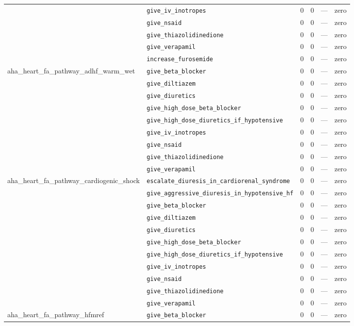 \begin{table}[ht]
\begin{tabular}{llrrrl}
 & \texttt{give\_iv\_inotropes} & 0 & 0 & — & zero \\
 & \texttt{give\_nsaid} & 0 & 0 & — & zero \\
 & \texttt{give\_thiazolidinedione} & 0 & 0 & — & zero \\
 & \texttt{give\_verapamil} & 0 & 0 & — & zero \\
 & \texttt{increase\_furosemide} & 0 & 0 & — & zero \\
\midrule
aha\_heart\_fa\_pathway\_adhf\_warm\_wet & \texttt{give\_beta\_blocker} & 0 & 0 & — & zero \\
 & \texttt{give\_diltiazem} & 0 & 0 & — & zero \\
 & \texttt{give\_diuretics} & 0 & 0 & — & zero \\
 & \texttt{give\_high\_dose\_beta\_blocker} & 0 & 0 & — & zero \\
 & \texttt{give\_high\_dose\_diuretics\_if\_hypotensive} & 0 & 0 & — & zero \\
 & \texttt{give\_iv\_inotropes} & 0 & 0 & — & zero \\
 & \texttt{give\_nsaid} & 0 & 0 & — & zero \\
 & \texttt{give\_thiazolidinedione} & 0 & 0 & — & zero \\
 & \texttt{give\_verapamil} & 0 & 0 & — & zero \\
\midrule
aha\_heart\_fa\_pathway\_cardiogenic\_shock & \texttt{escalate\_diuresis\_in\_cardiorenal\_syndrome} & 0 & 0 & — & zero \\
 & \texttt{give\_aggressive\_diuresis\_in\_hypotensive\_hf} & 0 & 0 & — & zero \\
 & \texttt{give\_beta\_blocker} & 0 & 0 & — & zero \\
 & \texttt{give\_diltiazem} & 0 & 0 & — & zero \\
 & \texttt{give\_diuretics} & 0 & 0 & — & zero \\
 & \texttt{give\_high\_dose\_beta\_blocker} & 0 & 0 & — & zero \\
 & \texttt{give\_high\_dose\_diuretics\_if\_hypotensive} & 0 & 0 & — & zero \\
 & \texttt{give\_iv\_inotropes} & 0 & 0 & — & zero \\
 & \texttt{give\_nsaid} & 0 & 0 & — & zero \\
 & \texttt{give\_thiazolidinedione} & 0 & 0 & — & zero \\
 & \texttt{give\_verapamil} & 0 & 0 & — & zero \\
\midrule
aha\_heart\_fa\_pathway\_hfmref & \texttt{give\_beta\_blocker} & 0 & 0 & — & zero \\

\end{tabular}
\end{table}
